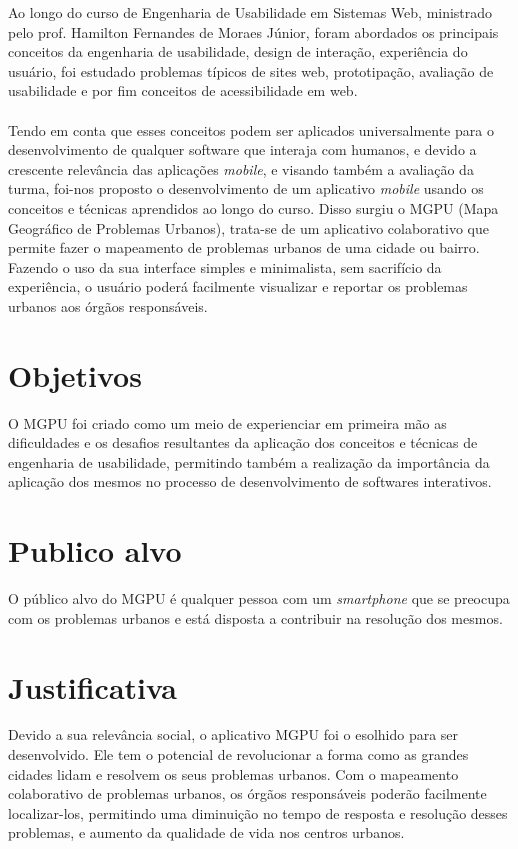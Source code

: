 \documentclass[a4paper,12pt,twoside]{report}
\begin{document}
Ao longo do curso de Engenharia de Usabilidade em Sistemas Web, ministrado pelo prof. Hamilton Fernandes de Moraes Júnior, foram abordados os principais conceitos da engenharia de usabilidade, design de interação, experiência do usuário, foi estudado problemas típicos de sites web, prototipação, avaliação de usabilidade e por fim conceitos de acessibilidade em web.
\\~\\
Tendo em conta que esses conceitos podem ser aplicados universalmente para o desenvolvimento de qualquer software que interaja com humanos, e devido a crescente relevância das aplicações \textit{mobile}, e visando também a avaliação da turma, foi-nos proposto o desenvolvimento de um aplicativo \textit{mobile} usando os conceitos e técnicas aprendidos ao longo do curso. Disso surgiu o MGPU (Mapa Geográfico de Problemas Urbanos), trata-se de um aplicativo colaborativo que permite fazer o mapeamento de problemas urbanos de uma cidade ou bairro. Fazendo o uso da sua interface simples e minimalista, sem sacrifício da experiência, o usuário poderá facilmente visualizar e reportar os problemas urbanos aos órgãos responsáveis.

\section{Objetivos}

O MGPU foi criado como um meio de experienciar em primeira mão as dificuldades e os desafios resultantes da aplicação dos conceitos e técnicas de engenharia de usabilidade, permitindo também a realização da importância da aplicação dos mesmos no processo de desenvolvimento de softwares interativos.  

\section{Publico alvo}

O público alvo do MGPU é qualquer pessoa com um \textit{smartphone} que se preocupa com os problemas urbanos e está disposta a contribuir na resolução dos mesmos.

\clearpage

\section{Justificativa}

Devido a sua relevância social, o aplicativo MGPU foi o esolhido para ser desenvolvido. Ele tem o potencial de revolucionar a forma como as grandes cidades lidam e resolvem os seus problemas urbanos. Com o mapeamento colaborativo de problemas urbanos, os órgãos responsáveis poderão facilmente localizar-los, permitindo uma diminuição no tempo de resposta e resolução desses problemas, e aumento da qualidade de vida nos centros urbanos.
\end{document}
